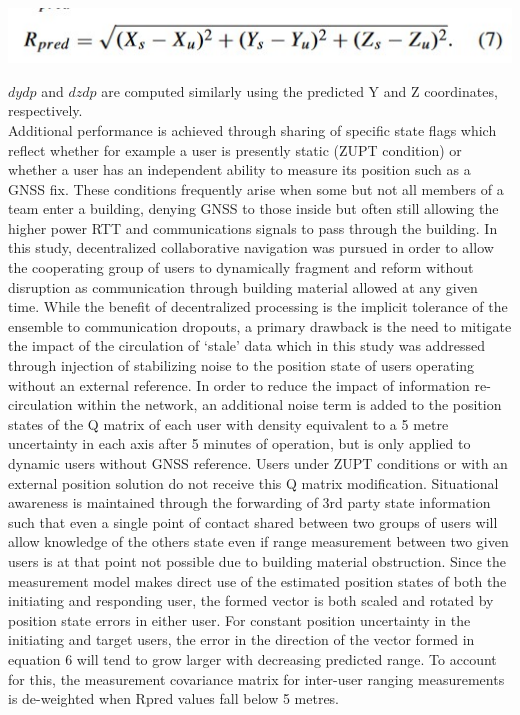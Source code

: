 \begin{center}
   \includegraphics{eq7.jpg}
   \end{center} 
\begin{math}dydp\end{math} and \begin{math}dzdp\end{math} are computed similarly using the predicted Y
and Z coordinates, respectively.\\
Additional performance is achieved through sharing of
specific state flags which reflect whether for example a user
is presently static (ZUPT condition) or whether a user has an
independent ability to measure its position such as a GNSS
fix. These conditions frequently arise when some but not
all members of a team enter a building, denying GNSS to
those inside but often still allowing the higher power RTT
and communications signals to pass through the building.
In this study, decentralized collaborative navigation was
pursued in order to allow the cooperating group of users
to dynamically fragment and reform without disruption as
communication through building material allowed at any given
time. While the benefit of decentralized processing is the
implicit tolerance of the ensemble to communication dropouts,
a primary drawback is the need to mitigate the impact of the
circulation of ‘stale’ data which in this study was addressed
through injection of stabilizing noise to the position state of
users operating without an external reference. In order to
reduce the impact of information re-circulation within the
network, an additional noise term is added to the position
states of the Q matrix of each user with density equivalent
to a 5 metre uncertainty in each axis after 5 minutes of
operation, but is only applied to dynamic users without GNSS
reference. Users under ZUPT conditions or with an external
position solution do not receive this Q matrix modification.
Situational awareness is maintained through the forwarding
of 3rd party state information such that even a single point
of contact shared between two groups of users will allow
knowledge of the others state even if range measurement
between two given users is at that point not possible due to
building material obstruction. Since the measurement model
makes direct use of the estimated position states of both the
initiating and responding user, the formed vector is both scaled
and rotated by position state errors in either user. For constant   position uncertainty in the initiating and target users, the error
in the direction of the vector formed in equation 6 will tend to
grow larger with decreasing predicted range. To account for
this, the measurement covariance matrix for inter-user ranging
measurements is de-weighted when Rpred values fall below
5 metres.